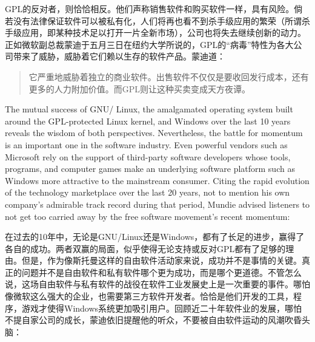 \fi

\ifdefined\chs
GPL的反对者，则恰恰相反。他们声称销售软件和购买软件一样，具有风险。倘若没有法律保证软件可以被私有化，人们将再也看不到杀手级应用的繁荣（所谓杀手级应用，即某种技术足以打开一片全新市场），公司也将失去继续创新的动力。正如微软副总裁蒙迪于五月三日在纽约大学所说的，GPL的``病毒''特性为各大公司带来了威胁，威胁着它们赖以生存的软件产品。蒙迪道：
\begin{quote}
它严重地威胁着独立的商业软件。出售软件不仅仅是要收回发行成本，还有更多的人力附加价值。而GPL则让这种买卖变成天方夜谭。
\end{quote}

\fi

\ifdefined\eng
The mutual success of GNU/ Linux, the amalgamated operating system built around the GPL-protected Linux kernel, and Windows over the last 10 years reveals the wisdom of both perspectives. Nevertheless, the battle for momentum is an important one in the software industry. Even powerful vendors such as Microsoft rely on the support of third-party software developers whose tools, programs, and computer games make an underlying software platform such as Windows more attractive to the mainstream consumer. Citing the rapid evolution of the technology marketplace over the last 20 years, not to mention his own company's admirable track record during that period, Mundie advised listeners to not get too carried away by the free software movement's recent momentum:
\fi

\ifdefined\chs
在过去的10年中，无论是GNU/Linux还是Windows，都有了长足的进步，赢得了各自的成功。两者双赢的局面，似乎使得无论支持或反对GPL都有了足够的理由。但是，作为像斯托曼这样的自由软件活动家来说，成功并不是事情的关键。真正的问题并不是自由软件和私有软件哪个更为成功，而是哪个更道德。不管怎么说，这场自由软件与私有软件的战役在软件工业发展史上是一次重要的事件。哪怕像微软这么强大的企业，也需要第三方软件开发者。恰恰是他们开发的工具，程序，游戏才使得Windows系统更加吸引用户。回顾近二十年软件业的发展，哪怕不提自家公司的成长，蒙迪依旧提醒他的听众，不要被自由软件运动的风潮吹昏头脑：
\fi

